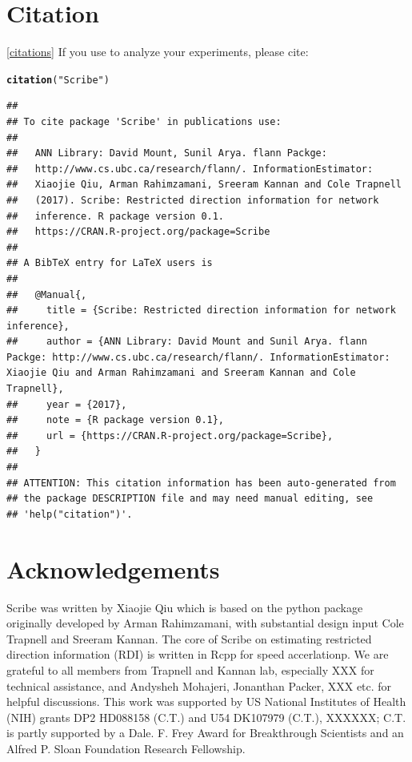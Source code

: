 \documentclass[10pt,oneside]{article}\usepackage[]{graphicx}\usepackage[]{color}
\makeatletter
\newcommand{\hlstr}[1]{\textcolor[rgb]{0.192,0.494,0.8}{#1}}%
\newcommand{\hlstd}[1]{\textcolor[rgb]{0.345,0.345,0.345}{#1}}%
\newcommand{\hlkwd}[1]{\textcolor[rgb]{0.737,0.353,0.396}{\textbf{#1}}}%
\newenvironment{kframe}{%
 \def\at@end@of@kframe{}%
 \ifinner\ifhmode%
  \def\at@end@of@kframe{\end{minipage}}%
  \begin{minipage}{\columnwidth}%
 \fi\fi%
 \def\FrameCommand##1{\hskip\@totalleftmargin \hskip-\fboxsep
 \colorbox{shadecolor}{##1}\hskip-\fboxsep
     \hskip-\linewidth \hskip-\@totalleftmargin \hskip\columnwidth}%
 \MakeFramed {\advance\hsize-\width
   \@totalleftmargin\z@ \linewidth\hsize
   \@setminipage}}%
 {\par\unskip\endMakeFramed%
 \at@end@of@kframe}
\newenvironment{knitrout}{}{} %
\makeatother
\begin{document}
 \section{Citation}\ref{citations}
 If you use  to analyze your experiments, please cite:
\begin{knitrout}
\color{fgcolor}\begin{kframe}
\begin{alltt}
\hlkwd{citation}\hlstd{(}\hlstr{"Scribe"}\hlstd{)}
\end{alltt}
\begin{verbatim}
## 
## To cite package 'Scribe' in publications use:
## 
##   ANN Library: David Mount, Sunil Arya. flann Packge:
##   http://www.cs.ubc.ca/research/flann/. InformationEstimator:
##   Xiaojie Qiu, Arman Rahimzamani, Sreeram Kannan and Cole Trapnell
##   (2017). Scribe: Restricted direction information for network
##   inference. R package version 0.1.
##   https://CRAN.R-project.org/package=Scribe
## 
## A BibTeX entry for LaTeX users is
## 
##   @Manual{,
##     title = {Scribe: Restricted direction information for network inference},
##     author = {ANN Library: David Mount and Sunil Arya. flann Packge: http://www.cs.ubc.ca/research/flann/. InformationEstimator: Xiaojie Qiu and Arman Rahimzamani and Sreeram Kannan and Cole Trapnell},
##     year = {2017},
##     note = {R package version 0.1},
##     url = {https://CRAN.R-project.org/package=Scribe},
##   }
## 
## ATTENTION: This citation information has been auto-generated from
## the package DESCRIPTION file and may need manual editing, see
## 'help("citation")'.
\end{verbatim}
\end{kframe}
\end{knitrout}

\section{Acknowledgements}

Scribe was written by Xiaojie Qiu which is based on the python package originally developed by Arman Rahimzamani, with substantial design input Cole Trapnell and Sreeram Kannan. The core of Scribe on estimating restricted direction information (RDI) is written in Rcpp for speed accerlationp. We are grateful to all members from Trapnell and Kannan lab, especially XXX for technical assistance, and Andysheh Mohajeri, Jonanthan Packer, XXX etc. for helpful discussions. This work was supported by  US National Institutes of Health (NIH) grants DP2 HD088158 (C.T.) and U54 DK107979 (C.T.), XXXXXX; C.T. is partly supported by a Dale. F. Frey Award for Breakthrough Scientists and an Alfred P. Sloan Foundation Research Fellowship.
\end{document}
